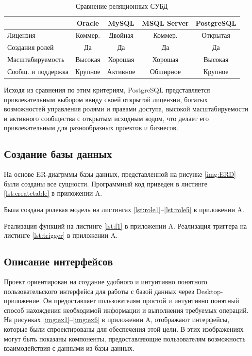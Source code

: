 \begin{table}[h!]
	\begin{center}
		\caption{Сравнение реляционных СУБД \cite{dbms}}
		\label{tab:comparison}
		\begin{tabular}{|l|c|c|c|c|}
			\hline
			& Oracle & MySQL & MSQL Server & PostgreSQL \\
			\hline
			Лицензия & Коммер. & Двойная & Коммер. & Открытая \\
			Создания ролей & Да & Да & Да & Да \\
			Масштабируемость & Высокая & Хорошая & Хорошая & Высокая \\
			Сообщ. и поддержка & Крупное & Активное & Обширное & Крупное \\
			\hline
		\end{tabular}
	\end{center}
\end{table}

Исходя из сравнения по этим критериям, PostgreSQL представляется привлекательным выбором ввиду своей открытой лицензии, богатых возможностей управления ролями и правами доступа, высокой масштабируемости и активного сообщества с открытым исходным кодом, что делает его привлекательным для разнообразных проектов и бизнесов.

\subsection{Создание базы данных}
На основе ER-диагрммы базы данных, представленной на рисунке \ref{img:ERD} были созданы все сущности. Программный код приведен в листинге \ref{lst:createtable} в приложении A.

Была создана ролевая модель на листингах \ref{lst:role1}--\ref{lst:role5} в приложении A.

Реализация функций на листинге \ref{lst:f1} в приложении A.
Реализация триггера на листинге \ref{lst:trigger} в приложении A.

\subsection{Описание интерфейсов}
Проект ориентирован на создание удобного и интуитивно понятного пользовательского интерфейса для работы с базой данных через Desktop-приложение.
Он предоставляет пользователям простой и интуитивно понятный способ нахождения необходимой информации и выполнения требуемых операций.
На рисунках \ref{img:ex1}--\ref{img:ex6} в приложении A, отображают интерфейсы, которые были спроектированы для обеспечения этой цели.
В этих изображениях могут быть показаны компоненты, предоставляющие пользователям возможность взаимодействия с данными из базы данных.

